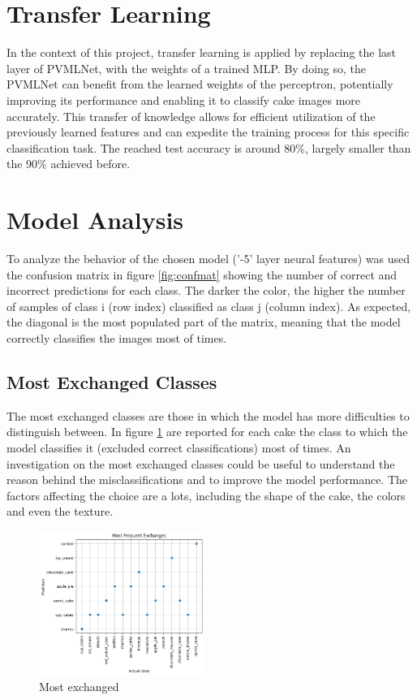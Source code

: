 \documentclass{article}
\begin{document}
\begin{multicols}{2}
\section{Transfer Learning}
In the context of this project, transfer learning is applied by replacing the last layer of PVMLNet, with the weights of a trained MLP. By doing so, the PVMLNet can benefit from 
the learned weights of the perceptron, potentially improving its performance and enabling it to classify cake images more accurately. 
This transfer of knowledge allows for efficient utilization of the previously learned features and can expedite the training process for this specific classification task.
The reached test accuracy is around 80\%, largely smaller than the 90\% achieved before.




\section{Model Analysis}
To analyze the behavior of the chosen model ('-5' layer neural features) was used the confusion matrix in figure \ref{fig:confmat} showing the number of correct and 
incorrect predictions for each class. The darker the color, the higher the number of samples of class i (row index) classified as class j (column index). 
As expected, the diagonal is the most populated part of the matrix, meaning that the model correctly classifies the images most of times.

\subsection{Most Exchanged Classes}
The most exchanged classes are those in which the model has more difficulties to distinguish between. In figure \ref{fig:mostex} are reported for each cake the class to which
the model classifies it (excluded correct classifications) most of times. An investigation on the most exchanged classes could be useful to understand the reason behind the
misclassifications and to improve the model performance. The factors affecting the choice are a lots, including the shape of the cake, the colors and 
even the texture.

    \begin{figure}[H]
        \centering
        \includegraphics[width=0.48\textwidth]{mostex.png}
        \caption{\small Most exchanged}
        \label{fig:mostex}
    \end{figure}



\end{multicols}
\end{document}

